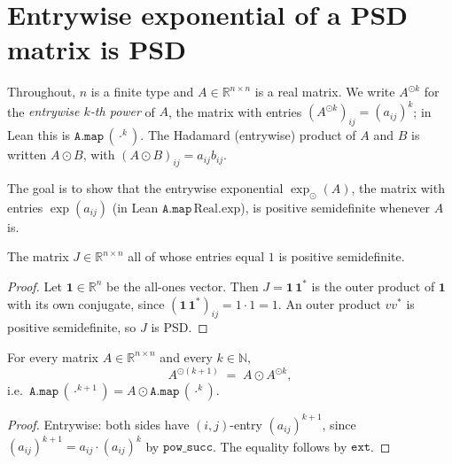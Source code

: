 
\section{Entrywise exponential of a PSD matrix is PSD}

Throughout, $n$ is a finite type and $A \in \mathbb{R}^{n \times n}$ is a real
matrix. We write $A^{\odot k}$ for the \emph{entrywise $k$-th power} of $A$,
the matrix with entries $(A^{\odot k})_{ij} = (a_{ij})^k$; in Lean this is
$\texttt{A.map}\,(\cdot^k)$. The Hadamard (entrywise) product of $A$ and $B$ is
written $A \odot B$, with $(A \odot B)_{ij} = a_{ij} b_{ij}$.

The goal is to show that the entrywise exponential $\exp_{\odot}(A)$, the matrix
with entries $\exp(a_{ij})$ (in Lean $\texttt{A.map}\,\mathrm{Real.exp}$), is
positive semidefinite whenever $A$ is.

\begin{lemma}
    \label{lem:const-one-psd}
    \leanok
    The matrix $J \in \mathbb{R}^{n \times n}$ all of whose entries equal $1$ is
    positive semidefinite.
\end{lemma}
\begin{proof}
    Let $\mathbf{1} \in \mathbb{R}^n$ be the all-ones vector. Then
    $J = \mathbf{1}\,\mathbf{1}^{\!*}$ is the outer product of $\mathbf{1}$ with
    its own conjugate, since $(\mathbf{1}\,\mathbf{1}^{\!*})_{ij} = 1 \cdot 1 = 1$.
    An outer product $v v^{*}$ is positive semidefinite, so $J$ is PSD.
\end{proof}

\begin{lemma}
    \label{lem:hadamard-pow-succ}
    \leanok
    For every matrix $A \in \mathbb{R}^{n \times n}$ and every $k \in \mathbb{N}$,
    \[
        A^{\odot (k+1)} \;=\; A \odot A^{\odot k},
    \]
    i.e.\ $\texttt{A.map}\,(\cdot^{k+1}) = A \odot \texttt{A.map}\,(\cdot^{k})$.
\end{lemma}
\begin{proof}
    Entrywise: both sides have $(i,j)$-entry $(a_{ij})^{k+1}$, since
    $(a_{ij})^{k+1} = a_{ij} \cdot (a_{ij})^k$ by $\texttt{pow\_succ}$. The
    equality follows by $\texttt{ext}$.
\end{proof}


